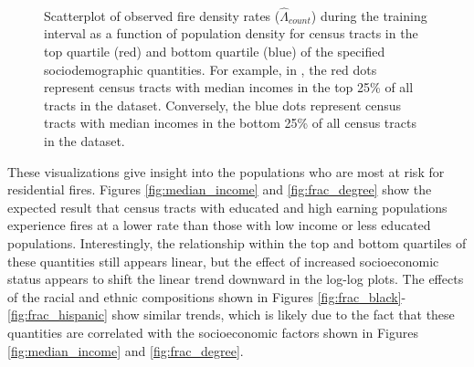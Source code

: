 \documentclass{svjour3}
\begin{document}
\begin{figure}[!ht]
\begin{center}
{          }\\
      \end{center}
      \caption{Scatterplot of observed fire density rates ($\hat\Lambda_{count}$) during the training interval as a function of population density for census tracts in the top quartile (red) and bottom quartile (blue) of the specified sociodemographic quantities. For example, in \protect{}, the red dots represent census tracts with median incomes in the top 25\% of all tracts in the dataset. Conversely, the blue dots represent census tracts with median incomes in the bottom 25\% of all census tracts in the dataset.}
     \label{fig:sociodemographic}
  \end{figure}
 
 
 These visualizations give insight into the populations who are most at risk for residential fires. Figures \ref{fig:median_income} and \ref{fig:frac_degree} show the expected result that census tracts with educated and high earning populations experience fires at a lower rate than those with low income or less educated populations. Interestingly, the relationship within the top and bottom quartiles of these quantities still appears linear, but the effect of increased socioeconomic status appears to shift the linear trend downward in the log-log plots. The effects of the racial and ethnic compositions shown in Figures \ref{fig:frac_black}-\ref{fig:frac_hispanic} show similar trends, which is likely due to the fact that these quantities are correlated with the socioeconomic factors shown in Figures \ref{fig:median_income} and \ref{fig:frac_degree}. 
 
\end{document}
